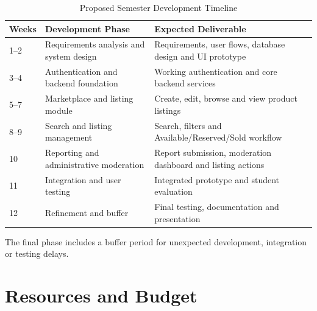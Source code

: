 \documentclass[11pt,a4paper]{article}
\begin{document}
\begin{table}[H]
\centering

\renewcommand{\arraystretch}{1.3}

\begin{tabular}{
    p{1.0cm}
    p{5.0cm}
    p{6.4cm}
}

\toprule

\textbf{Weeks} &
\textbf{Development Phase} &
\textbf{Expected Deliverable}
\\

\midrule

1--2 &
Requirements analysis and system design &
Requirements, user flows, database design and UI prototype
\\

3--4 &
Authentication and backend foundation &
Working authentication and core backend services
\\

5--7 &
Marketplace and listing module &
Create, edit, browse and view product listings
\\

8--9 &
Search and listing management &
Search, filters and Available/Reserved/Sold workflow
\\

10 &
Reporting and administrative moderation &
Report submission, moderation dashboard and listing actions
\\

11 &
Integration and user testing &
Integrated prototype and student evaluation
\\

12 &
Refinement and buffer &
Final testing, documentation and presentation
\\

\bottomrule

\end{tabular}

\caption{Proposed Semester Development Timeline}

\end{table}

The final phase includes a buffer period for unexpected development,
integration or testing delays.


\section{Resources and Budget}
\end{document}
